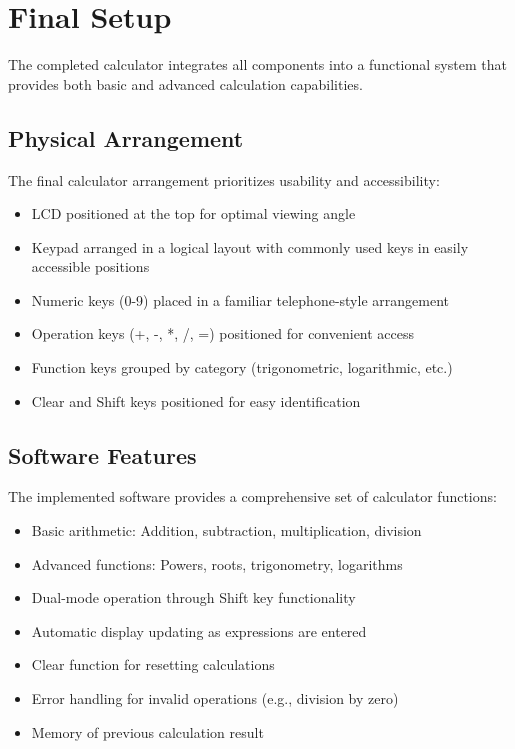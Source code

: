 \documentclass[12pt]{article}
\begin{document}
	\section{Final Setup}
	The completed calculator integrates all components into a functional system that provides both basic and advanced calculation capabilities.
	
	\subsection{Physical Arrangement}
	The final calculator arrangement prioritizes usability and accessibility:
	
	\begin{itemize}
		\item LCD positioned at the top for optimal viewing angle
		\item Keypad arranged in a logical layout with commonly used keys in easily accessible positions
		\item Numeric keys (0-9) placed in a familiar telephone-style arrangement
		\item Operation keys (+, -, *, /, =) positioned for convenient access
		\item Function keys grouped by category (trigonometric, logarithmic, etc.)
		\item Clear and Shift keys positioned for easy identification
	\end{itemize}
	
	\subsection{Software Features}
	The implemented software provides a comprehensive set of calculator functions:
	
	\begin{itemize}
		\item Basic arithmetic: Addition, subtraction, multiplication, division
		\item Advanced functions: Powers, roots, trigonometry, logarithms
		\item Dual-mode operation through Shift key functionality
		\item Automatic display updating as expressions are entered
		\item Clear function for resetting calculations
		\item Error handling for invalid operations (e.g., division by zero)
		\item Memory of previous calculation result
	\end{itemize}
	
\end{document}
